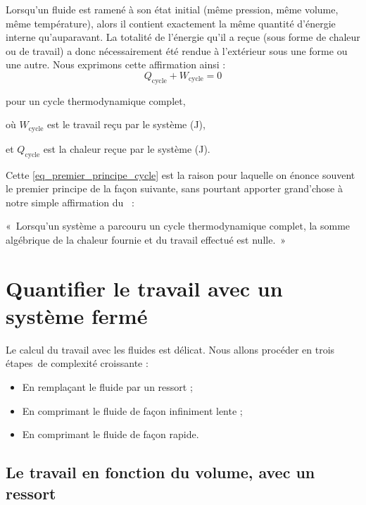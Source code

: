 	Lorsqu’un fluide est ramené à son état initial (même pression, même volume, même température), alors il contient exactement la même quantité d’énergie interne qu’auparavant. La totalité de l’énergie qu’il a reçue (sous forme de chaleur ou de travail) a donc nécessairement été rendue à l’extérieur sous une forme ou une autre. Nous exprimons cette affirmation ainsi :
	\begin{equation}
	Q_{\text{cycle}} + W_{\text{cycle}} = 0
	\label{eq_premier_principe_cycle}
	\end{equation}
	\begin{equationterms}
		\item pour un cycle thermodynamique complet,
		\item où \tab $W_\text{cycle}$ \tab est le travail reçu par le système (\si{\joule}),
		\item et \tab $Q_\text{cycle}$ \tab est la chaleur reçue par le système (\si{\joule}).
	\end{equationterms}

	Cette \cref{eq_premier_principe_cycle} est la raison pour laquelle on énonce souvent le premier principe de la façon suivante, sans pourtant apporter grand’chose à notre simple affirmation du \coursunshort~:

	«~Lorsqu’un système a parcouru un cycle thermodynamique complet, la somme algébrique de la chaleur fournie et du travail effectué est nulle.~»



\section[Quantifier le travail avec un système fermé]{Quantifier le travail avec un système\onlyamphibook{\\} fermé}

	Le calcul du travail avec les fluides est délicat. Nous allons procéder en trois étapes~de complexité croissante :

	\begin{itemize}
		\item En remplaçant le fluide par un ressort ;
		\item En comprimant le fluide de façon infiniment lente ;
		\item En comprimant le fluide de façon rapide.
	\end{itemize}



	\subsection{Le travail en fonction du volume, avec un ressort}
	\label{ch_travail_pdv}

